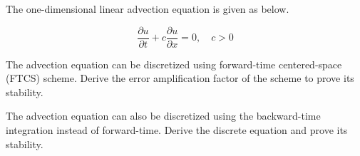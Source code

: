 
\question{}\label{mid-q2}

The one-dimensional linear advection equation is given as below.  
	
	
	\begin{equation}
	\frac{\partial u}{\partial t} + c \frac{\partial u}{\partial x} = 0, \quad c > 0 \nonumber
	\end{equation}		

\listbeginx	%

    \item \label{mid-q2a} The advection equation can be discretized using forward-time centered-space (FTCS) scheme. Derive the error amplification factor of the scheme to prove its stability.	




		
	\item The advection equation can also be discretized using the backward-time integration instead of forward-time. Derive the discrete equation and prove its stability.   
	

		
\listclose	%
